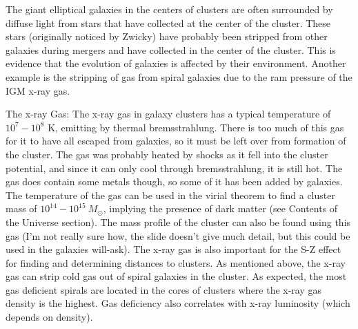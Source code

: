 The giant elliptical galaxies in the centers of clusters are often surrounded 
by diffuse light from stars that have collected at the center of the cluster.  
These stars (originally noticed by Zwicky) have probably been 
stripped from other galaxies during mergers and have collected in the center 
of the cluster.  This is evidence that the evolution of galaxies is affected 
by their environment.  Another example is the stripping of gas from spiral 
galaxies due to the ram pressure of the IGM x-ray gas.  

The x-ray Gas:\newline
The x-ray gas in galaxy clusters has a typical temperature of $10^7-10^8$ K, 
emitting by thermal bremsstrahlung.  There is too much of this gas for it 
to have all escaped from galaxies, so it must be left over from formation of 
the cluster.  The gas was probably heated by shocks as it fell into the cluster 
potential, and since it can only cool through bremsstrahlung, it is still hot.  
The gas does contain some metals though, so some of it has been added by 
galaxies.  The temperature of the gas can be used in the virial theorem to 
find a cluster mass of $10^{14}-10^{15}\ M_{\odot}$, implying the presence of 
dark matter (see Contents of the Universe section).  The mass profile of the 
cluster can also be found using this gas (I'm not really sure how, the slide 
doesn't give much detail, but this could be used in the galaxies will-ask).  
The x-ray gas is also important for the S-Z effect for finding and determining 
distances to clusters.  As mentioned above, the x-ray gas can strip cold gas 
out of spiral galaxies in the cluster.  As expected, the most gas 
deficient spirals are located in the cores of clusters where the x-ray gas 
density is the highest.  Gas deficiency also correlates with x-ray luminosity 
(which depends on density). 


